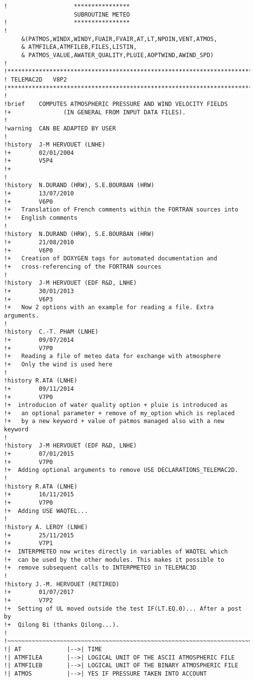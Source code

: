 \begin{lstlisting}
!                   ****************
                    SUBROUTINE METEO
!                   ****************
!
     &(PATMOS,WINDX,WINDY,FUAIR,FVAIR,AT,LT,NPOIN,VENT,ATMOS,
     & ATMFILEA,ATMFILEB,FILES,LISTIN,
     & PATMOS_VALUE,AWATER_QUALITY,PLUIE,AOPTWIND,AWIND_SPD)
!
!***********************************************************************
! TELEMAC2D   V8P2
!***********************************************************************
!
!brief    COMPUTES ATMOSPHERIC PRESSURE AND WIND VELOCITY FIELDS
!+               (IN GENERAL FROM INPUT DATA FILES).
!
!warning  CAN BE ADAPTED BY USER
!
!history  J-M HERVOUET (LNHE)
!+        02/01/2004
!+        V5P4
!+
!
!history  N.DURAND (HRW), S.E.BOURBAN (HRW)
!+        13/07/2010
!+        V6P0
!+   Translation of French comments within the FORTRAN sources into
!+   English comments
!
!history  N.DURAND (HRW), S.E.BOURBAN (HRW)
!+        21/08/2010
!+        V6P0
!+   Creation of DOXYGEN tags for automated documentation and
!+   cross-referencing of the FORTRAN sources
!
!history  J-M HERVOUET (EDF R&D, LNHE)
!+        30/01/2013
!+        V6P3
!+   Now 2 options with an example for reading a file. Extra arguments.
!
!history  C.-T. PHAM (LNHE)
!+        09/07/2014
!+        V7P0
!+   Reading a file of meteo data for exchange with atmosphere
!+   Only the wind is used here
!
!history R.ATA (LNHE)
!+        09/11/2014
!+        V7P0
!+  introducion of water quality option + pluie is introduced as
!+   an optional parameter + remove of my_option which is replaced
!+   by a new keyword + value of patmos managed also with a new keyword
!
!history  J-M HERVOUET (EDF R&D, LNHE)
!+        07/01/2015
!+        V7P0
!+  Adding optional arguments to remove USE DECLARATIONS_TELEMAC2D.
!
!history R.ATA (LNHE)
!+        16/11/2015
!+        V7P0
!+  Adding USE WAQTEL...
!
!history A. LEROY (LNHE)
!+        25/11/2015
!+        V7P1
!+  INTERPMETEO now writes directly in variables of WAQTEL which
!+  can be used by the other modules. This makes it possible to
!+  remove subsequent calls to INTERPMETEO in TELEMAC3D
!
!history J.-M. HERVOUET (RETIRED)
!+        01/07/2017
!+        V7P2
!+  Setting of UL moved outside the test IF(LT.EQ.0)... After a post by
!+  Qilong Bi (thanks Qilong...).
!
!~~~~~~~~~~~~~~~~~~~~~~~~~~~~~~~~~~~~~~~~~~~~~~~~~~~~~~~~~~~~~~~~~~~~~~~
!| AT             |-->| TIME
!| ATMFILEA       |-->| LOGICAL UNIT OF THE ASCII ATMOSPHERIC FILE
!| ATMFILEB       |-->| LOGICAL UNIT OF THE BINARY ATMOSPHERIC FILE
!| ATMOS          |-->| YES IF PRESSURE TAKEN INTO ACCOUNT

\end{lstlisting}
